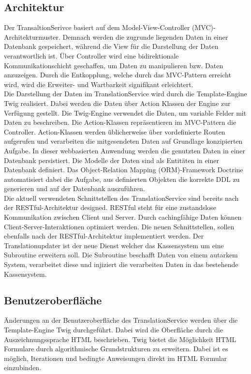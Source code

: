 \documentclass[10pt, oneside, ngerman]{article}
\begin{document}
    \subsection{Architektur}\label{sec:architecture}
      Der TransaltionSerivce basiert auf dem Model-View-Controller (MVC)-Architekturmuster. Demnach werden die zugrunde liegenden Daten in einer Datenbank gespeichert, während die View für
      die Darstellung der Daten verantwortlich ist. Über Controller wird eine bidirektionale Kommunikationschicht geschaffen, um Daten zu manipulieren bzw. Daten anzuzeigen.
      Durch die Entkopplung, welche durch das MVC-Pattern erreicht wird, wird die Erweiter- und Wartbarkeit signifikant erleichtert.\\
      Die Darstellung der Daten im TranslationService wird durch die Template-Engine Twig realisiert. Dabei werden die Daten über Action Klassen der Engine zur Verfügung gestellt.
      Die Twig-Engine verwendet die Daten, um variable Felder mit Daten zu beschreiben. Die Action-Klassen repräsentieren im MVC-Pattern die Controller. Action-Klassen werden üblicherweise über %
      vordefinierte Routen aufgerufen und verarbeiten die mitgesendeten Daten auf Grundlage konzipierten Aufgabe. 
      In dieser webbasierten Anwendung werden die genutzten Daten in einer Datenbank persistiert. Die Modelle der Daten sind als Entitäten in einer Datenbank definiert.
      Das Object-Relation Mapping (ORM)-Framework Doctrine automatisiert dabei die Aufgabe, aus definierten Objekten die korrekte DDL zu generieren und auf der Datenbank auszuführen.\\ 
      Die aktuell verwendeten Schnittstellen des TranslationService sind bereits nach der RESTful-Architektur designed. RESTful steht für eine zustandslose 
      Kommunikation zwischen Client und Server. Durch cachingfähige Daten können Client-Server-Interaktionen optimiert werden. 
      Die neuen Schnittstellen, sollen ebenfalls nach der RESTful-Architektur implementiert werden.  
      Der Translationupdater ist der neue Dienst welcher das Kassensystem um eine Subroutine erweitern soll. Die Subroutine beschafft Daten von einem autarkem System, verarbeitet diese 
      und injiziert die verarbeiten Daten in das bestehende Kassensystem.
    \subsection{Benutzeroberfläche}\label{sec:dr:ui}
    Änderungen an der Benutzeroberfläche des TranslationService werden über die Template-Engine Twig durchgeführt. Dabei wird die Oberfläche durch die Auszeichnungssprache HTML beschrieben. Twig bietet die Möglichkeit
    HTML Formulare durch algorithmische Grundstrukturen zu erweitern. Dabei ist es möglich, Iterationen und bedingte Anweisungen direkt im HTML Formular einzubinden.
\end{document}
